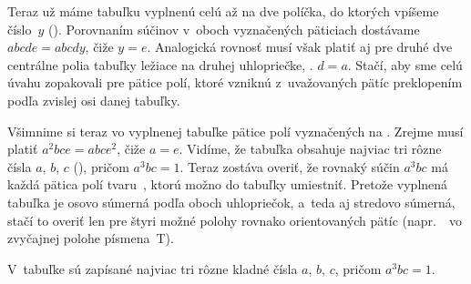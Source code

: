 {\medskip
\line{\hfil\inspicture-!\hfil\hfil\inspicture-!\hfil}
\medskip

Teraz už máme tabuľku vyplnenú celú až na dve políčka, do ktorých
vpíšeme číslo~$y$ (\obr). Porovnaním súčinov v~oboch vyznačených
päticiach dostávame $abcde=abcdy$, čiže $y=e$. Analogická
rovnosť musí však platiť aj pre druhé dve centrálne polia tabuľky
ležiace na druhej uhlopriečke, \tj. $d=a$. Stačí, aby sme celú úvahu
zopakovali pre pätice polí, ktoré vzniknú z~uvažovaných pätíc
preklopením podľa zvislej osi danej tabuľky.

Všimnime si teraz vo vyplnenej tabuľke pätice polí vyznačených na
\obr. Zrejme musí platiť $a^2bce=abce^2$, čiže $a=e$. Vidíme,
že tabuľka obsahuje najviac tri rôzne čísla $a$, $b$, $c$ (\obr),
pričom $a^3bc=1$. Teraz zostáva overiť, že rovnaký súčin $a^3bc$ má
každá pätica polí tvaru~\Te, ktorú možno do tabuľky umiestniť.
Pretože vyplnená tabuľka je osovo súmerná podľa oboch uhlopriečok,
a~teda aj stredovo súmerná, stačí to overiť len pre štyri možné
polohy rovnako orientovaných pätíc (napr.~\Te\ vo zvyčajnej polohe
písmena~T).


\medskip
\line{\hfil\vbox{\hsize 5cm\centerline{\hbox{\inspicture-!{}\quad\inspicture-!{}}}\centerline{\Obr}}
\hfil\hfil\vbox{\hsize 3cm\centerline{\hbox{\inspicture-!{}}}\centerline{\Obr}}\hfil}
\medskip

\odpoved
V~tabuľke sú zapísané najviac tri rôzne kladné
čísla $a$, $b$, $c$, pričom $a^3bc=1$.}

